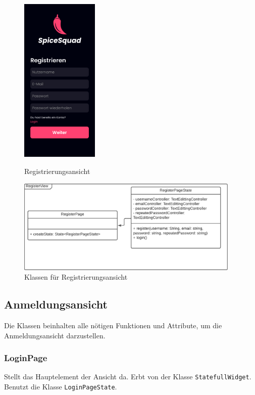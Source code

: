 \documentclass{entwurfsheft}
\begin{document}
    \begin{figure}[htp]
        \begin{minipage}
            [t]{0.49\textwidth}
            \centering
            \includegraphics[height=80mm]{images/Presentation-layer/RegisterView.jpg}
            \caption{Registrierungsansicht}
        \end{minipage}
        \begin{minipage}
            [t]{0.49\textwidth}
            \centering
            \includegraphics[width=0.95\textwidth]{images/Presentation-layer/RegisterViewClass.pdf}
            \caption{Klassen für Registrierungsansicht}
        \end{minipage}
    \end{figure} 
        
\newpage

\subsection{Anmeldungsansicht}
    Die Klassen beinhalten alle nötigen Funktionen und Attribute, um die Anmeldungsansicht darzustellen.

    \subsubsection{LoginPage}
        Stellt das Hauptelement der Ansicht da. Erbt von der Klasse \texttt{StatefullWidget}. Benutzt die Klasse \texttt{LoginPageState}.
\end{document}
